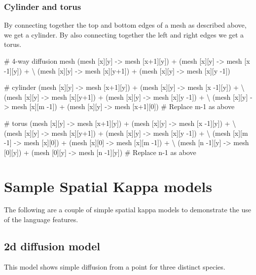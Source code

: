 \subsubsection{Cylinder and torus}

By connecting together the top and bottom edges of a mesh as described above, we get a cylinder. By also connecting together the left and right edges we get a torus.

\begin{kappasource}

# 4-way diffusion mesh
    (mesh [x][y] -> mesh [x+1][y]) + (mesh [x][y] -> mesh [x -1][y]) + {\textbackslash}
    (mesh [x][y] -> mesh [x][y+1]) + (mesh [x][y] -> mesh [x][y -1])

# cylinder
    (mesh [x][y] -> mesh [x+1][y]) + (mesh [x][y] -> mesh [x -1][y]) + {\textbackslash}
    (mesh [x][y] -> mesh [x][y+1]) + (mesh [x][y] -> mesh [x][y -1]) + {\textbackslash}
    (mesh [x][y] -> mesh [x][m -1]) + (mesh [x][y] -> mesh [x+1][0]) 
# Replace m-1 as above 

# torus
    (mesh [x][y] -> mesh [x+1][y]) + (mesh [x][y] -> mesh [x -1][y]) + {\textbackslash}
    (mesh [x][y] -> mesh [x][y+1]) + (mesh [x][y] -> mesh [x][y -1]) + {\textbackslash}
    (mesh [x][m -1] -> mesh [x][0]) + (mesh [x][0] -> mesh [x][m -1]) + {\textbackslash}
    (mesh [n -1][y] -> mesh [0][y]) + (mesh [0][y] -> mesh [n -1][y])
# Replace n-1 as above 
\end{kappasource}

\newpage
\section{Sample Spatial Kappa models}

The following are a couple of simple spatial kappa models to demonstrate the use of the language features.



\subsection{2d diffusion model}
\label{sec:2dDiffusion}

This model shows simple diffusion from a point for three distinct species.


